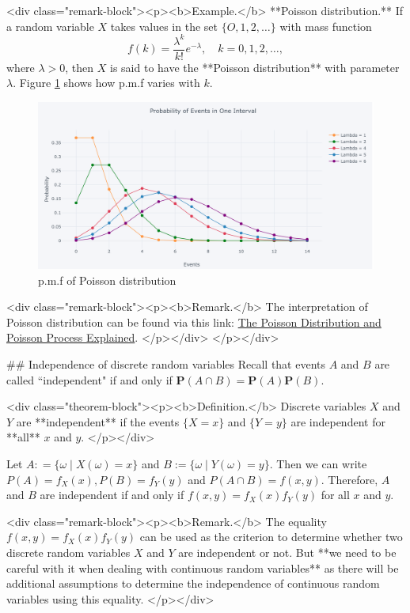 <div class="remark-block"><p><b>Example.</b> 
**Poisson distribution.** If a random variable $X$ takes values in the set $\{O, 1, 2, \dots \}$ with mass function
$$\begin{equation}
    f(k) = \frac{\lambda^k}{k!} e^{-\lambda}, \quad k = 0, 1, 2, \dots, 
\end{equation}$$
where $\lambda > 0$, then $X$ is said to have the **Poisson distribution** with parameter $\lambda$. Figure \ref{fig:poisson} shows how p.m.f varies with $k$.
\begin{figure}[!htb]
    \centering
    \includegraphics[scale=0.18]{plots/poisson.png}
    \caption{p.m.f of Poisson distribution}
    \label{fig:poisson}
\end{figure}

<div class="remark-block"><p><b>Remark.</b> 
The interpretation of Poisson distribution can be found via this link: \href{https://towardsdatascience.com/the-poisson-distribution-and-poisson-process-explained-4e2cb17d459}{The Poisson Distribution and Poisson Process Explained}.
</p></div>
</p></div>


## Independence of discrete random variables
Recall that events $A$ and $B$ are called ``independent" if and only if $\mathbf{P}(A \cap B) = \mathbf{P}(A)\mathbf{P}(B)$. 

<div class="theorem-block"><p><b>Definition.</b> 
Discrete variables $X$ and $Y$ are **independent** if the events $\{X = x\}$ and $\{Y = y\}$ are independent for **all** $x$ and $y$. 
</p></div>

Let $A: = \{ \omega \;\vert\; X(\omega) = x \}$ and $B:= \{ \omega \;\vert\; Y(\omega) = y \}$. Then we can write $P(A) = f_X(x), P(B) = f_Y(y)$ and $P(A \cap B) = f(x, y)$. Therefore, $A$ and $B$ are independent if and only if $f(x,y) = f_X(x) f_Y(y)$ for all $x$ and $y$.

<div class="remark-block"><p><b>Remark.</b> 
The equality $f(x,y) = f_X(x) f_Y(y)$ can be used as the criterion to determine whether two discrete random variables $X$ and $Y$ are independent or not. But **we need to be careful with it when dealing with continuous random variables** as there will be additional assumptions to determine the independence of continuous random variables using this equality.
</p></div>

